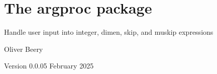 \documentclass{article}
\begin{document}
\section*{\Large The \textsf{argproc} package}

Handle user input into integer, dimen, skip, and muskip expressions

Oliver Beery

Version 0.0.0\quad{}5 February 2025

\end{document}
